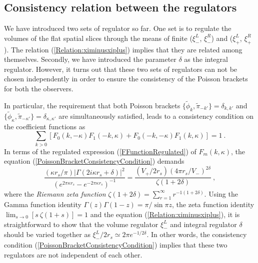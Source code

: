 \documentclass[aps,12pt,showpacs]{revtex4-2}
\def\kr{\kappa}
\def\rs{r_s}
\begin{document}
\subsection{Consistency relation between the regulators}          

We have introduced two sets of regulator so far. One set is to regulate the 
volumes of the flat spatial slices through the means of finite ($\xi_{-}^L$, 
$\xi_{-}^R$) and ($\xi_{+}^L$, $\xi_{+}^R$). The relation 
(\ref{Relation:ximinusxiplus}) implies that they are related among 
themselves. Secondly, we have introduced the parameter $\delta$ as the integral 
regulator. However, it turns out that these two sets of regulators can not be 
chosen independently in order to ensure the consistency of the Poisson brackets 
for both the observers. 
        

In particular, the requirement that both Poisson brackets 
$\{\tilde{\phi}_{k},\tilde{\pi}_{-k'}\} = \delta_{k,k'}$ and
$\{\tilde{\phi}_{\kr},\tilde{\pi}_{-\kr'}\} = \delta_{\kr,\kr'}$
are simultaneously satisfied, leads to a consistency condition on the
coefficient functions as
%
\begin{equation}\label{PoissonBracketConsistencyCondition}
\sum_{k>0} \left[ F_{0}(k,-\kr)F_{1}(-k,\kr) 
+ F_{0}(-k,-\kr)F_{1}(k,\kr) \right] = 1 ~.
\end{equation}
%
In terms of the regulated expression (\ref{FFunctionRegulated}) of 
$F_{m}(k,\kr)$, the  equation (\ref{PoissonBracketConsistencyCondition}) demands
%
\begin{equation}\label{PoissonBracketConsistencyCondition2}
\frac{(\kr\rs/\pi) |\Gamma(2i\kr\rs + \delta)|^2}
{(e^{2\pi\kr\rs}-e^{-2\pi\kr\rs})^{-1}}
= \frac{(V_{+}/2\rs) (4\pi\rs/V_{-})^{2\delta} }{\zeta(1+2\delta)} ~,
\end{equation}
%
where the \emph{Riemann zeta function} $\zeta(1+2\delta) = \sum_{r=1}^{\infty} 
r^{-1(1+2\delta)}$. Using the Gamma function identity 
$\Gamma(z)\Gamma(1-z) = \pi/\sin\pi z$, the zeta function identity 
$\lim_{s\to0}[s~ \zeta(1+s)] = 1$ and the equation 
(\ref{Relation:ximinusxiplus}), it is straightforward to show that 
the volume regulator $\xi_{-}^L$ and integral regulator $\delta$ should be
varied together as $\xi_{-}^L/2\rs \simeq 2\pi e^{-1/2\delta}$. In other words,
the consistency condition (\ref{PoissonBracketConsistencyCondition}) implies
that these two regulators are not independent of each other.
\end{document}

